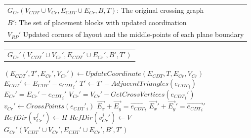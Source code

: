       \newcommand{\CGU}{\ensuremath{\mbox{\sc CrossGraphUpdate}}}
      \begin{algorithm}[t]  
        \caption{$\CGU(G_{Cr},B',V_{RP}')$}\label{alg:CGU}                       
        \begin{scriptsize}
          \begin{algorithmic}[1]
            \REQUIRE 
              \begin{tabular}{l}
                $G_{Cr}(V_{CDT}\cup V_{Cr}, E_{CDT} \cup E_{Cr},B,T)$: The original crossing graph\\
                $B'$: The set of placement blocks with updated coordination \\
                $V_{RP}'$ Updated corners of layout and the middle-points of each plane boundary
              \end{tabular}
            \ENSURE 
              \begin{tabular}{l}
                $G_{Cr}'(V_{CDT}'\cup V_{Cr}',E_{CDT}'\cup E_{Cr}',B',T')$
              \end{tabular}
            \STATE $(E_{CDT}',T',E_{Cr}',V_{Cr}') \gets UpdateCoordinate(E_{CDT},T,E_{Cr},V_{Cr})$
              \label{line:CEUstart}
                \STATE $E_{CDT}' \gets E_{CDT}' - {e_{CDT}}_i'$
                \STATE $T' \gets T' - AdjacentTriangles({e_{CDT}}_i)$
                  \STATE $E_{Cr}' = E_{Cr}'- {e_{CDT}}_i'$
                  \STATE $V_{Cr}' = V_{Cr}'- GetCrossVertices({e_{CDT}}_i')$
                \ENDIF\label{line:CEUend}
              \ELSE\label{line:RefDirUstart}
                \STATE $v_{Cr}' \gets CrossPoints({e_{CDT}}'_i)$
                \STATE $\overrightarrow{E_x} + \overrightarrow{E_y} = \overrightarrow{{e_{CDT}}_i}$
                \STATE $\overrightarrow{E_x}' + \overrightarrow{E_y}' = \overrightarrow{{e_{CDT}}_i}'$ 
                    \STATE $RefDir({v_{Cr}^j}')\gets H$
                    \STATE $RefDir({v_{Cr}^j}') \gets V$
                  \ENDIF
                \ENDFOR
              \ENDIF\label{line:RefDirUend}
            \ENDFOR
            \RETURN $G_{Cr}'(V_{CDT}'\cup V_{Cr}',E_{CDT}'\cup E_{Cr}',B',T')$
          \end{algorithmic}
        \end{scriptsize} 
      \end{algorithm}

